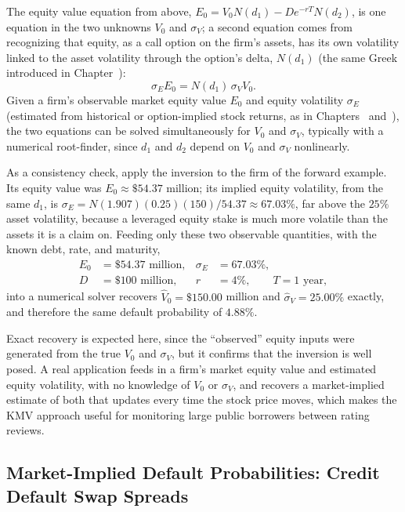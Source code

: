 \documentclass[../ai_in_finance]{subfiles}
\begin{document}
The equity value equation from above, $E_0 = V_0 N(d_1) - De^{-rT}N(d_2)$, is one equation in the two unknowns $V_0$ and $\sigma_V$; a second equation comes from recognizing that equity, as a call option on the firm's assets, has its own volatility linked to the asset volatility through the option's delta, $N(d_1)$ (the same Greek introduced in Chapter~):
\begin{equation}
\label{eq:creditrisk-equity-vol}
\sigma_E E_0 = N(d_1)\,\sigma_V V_0.
\end{equation}
Given a firm's observable market equity value $E_0$ and equity volatility $\sigma_E$ (estimated from historical or option-implied stock returns, as in Chapters~ and~), the two equations can be solved simultaneously for $V_0$ and $\sigma_V$, typically with a numerical root-finder, since $d_1$ and $d_2$ depend on $V_0$ and $\sigma_V$ nonlinearly.

As a consistency check, apply the inversion to the firm of the forward example. Its equity value was $E_0\approx\$54.37$ million; its implied equity volatility, from the same $d_1$, is $\sigma_E = N(1.907)(0.25)(150)/54.37 \approx 67.03\%$, far above the $25\%$ asset volatility, because a leveraged equity stake is much more volatile than the assets it is a claim on. Feeding only these two observable quantities, with the known debt, rate, and maturity,
\begin{align*}
E_0 &= \$54.37 \text{ million}, & \sigma_E &= 67.03\%, \\
D &= \$100 \text{ million}, & r &= 4\%, \qquad T = 1 \text{ year},
\end{align*}
into a numerical solver recovers $\hat V_0 = \$150.00$ million and $\hat\sigma_V = 25.00\%$ exactly, and therefore the same default probability of $4.88\%$.

Exact recovery is expected here, since the ``observed'' equity inputs were generated from the true $V_0$ and $\sigma_V$, but it confirms that the inversion is well posed.
A real application feeds in a firm's market equity value and estimated equity volatility, with no knowledge of $V_0$ or $\sigma_V$, and recovers a market-implied estimate of both that updates every time the stock price moves, which makes the KMV approach useful for monitoring large public borrowers between rating reviews.

\subsection{Market-Implied Default Probabilities: Credit Default Swap Spreads}
\label{sec:cds-implied-pd}
\end{document}
